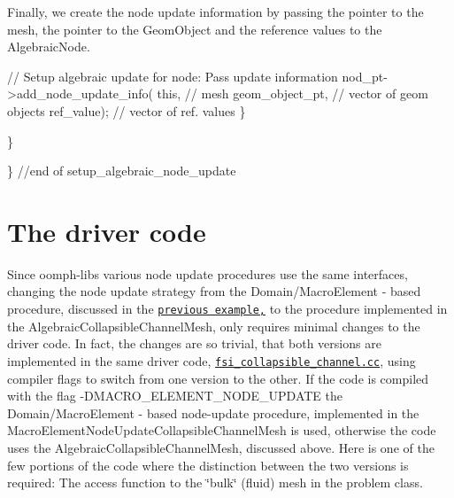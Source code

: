 Finally, we create the node update information by passing the pointer to the mesh, the pointer to the {\ttfamily Geom\+Object} and the reference values to the {\ttfamily Algebraic\+Node}.


\begin{DoxyCodeInclude}
  
     \textcolor{comment}{// Setup algebraic update for node: Pass update information}
     nod\_pt->add\_node\_update\_info(
      \textcolor{keyword}{this},               \textcolor{comment}{// mesh}
      geom\_object\_pt,     \textcolor{comment}{// vector of geom objects}
      ref\_value);         \textcolor{comment}{// vector of  ref. values}
    \}
   
  \}

\} \textcolor{comment}{//end of setup\_algebraic\_node\_update }

\end{DoxyCodeInclude}




\hypertarget{index_driver}{}\section{The driver code}\label{index_driver}
Since {\ttfamily oomph-\/lib\textquotesingle{}s} various node update procedures use the same interfaces, changing the node update strategy from the {\ttfamily Domain/\+Macro\+Element} -\/ based procedure, discussed in the \href{../../fsi_collapsible_channel/html/index.html}{\tt previous example,} to the procedure implemented in the {\ttfamily Algebraic\+Collapsible\+Channel\+Mesh}, only requires minimal changes to the driver code. In fact, the changes are so trivial, that both versions are implemented in the same driver code, \href{../../../../demo_drivers/interaction/fsi_collapsible_channel/fsi_collapsible_channel.cc}{\tt fsi\+\_\+collapsible\+\_\+channel.\+cc}, using compiler flags to switch from one version to the other. If the code is compiled with the flag {\ttfamily -\/\+D\+M\+A\+C\+R\+O\+\_\+\+E\+L\+E\+M\+E\+N\+T\+\_\+\+N\+O\+D\+E\+\_\+\+U\+P\+D\+A\+TE} the {\ttfamily Domain/\+Macro\+Element} -\/ based node-\/update procedure, implemented in the {\ttfamily Macro\+Element\+Node\+Update\+Collapsible\+Channel\+Mesh} is used, otherwise the code uses the {\ttfamily Algebraic\+Collapsible\+Channel\+Mesh}, discussed above. Here is one of the few portions of the code where the distinction between the two versions is required\+: The access function to the \char`\"{}bulk\char`\"{} (fluid) mesh in the problem class.

